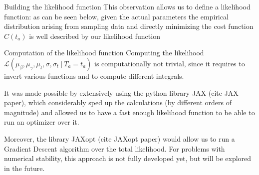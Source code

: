 \documentclass{beamer}
\begin{document}
\begin{frame}{Building the likelihood function}
  This observation allows us to define a likelihood function:
  as can be seen below, given the actual parameters the empirical distribution arising from sampling data and directly minimizing the cost function \(C(t_a)\) is well described by our likelihood function

  \begin{center}
  \end{center}
\end{frame}

\begin{frame}{Computation of the likelihood function}
  Computing the likelihood \(\mathcal{L}(\mu_\beta, \mu_\gamma, \mu_t, \sigma, \sigma_t\ \vert\ T_a = t_a)\) is computationally not trivial, since it requires to invert various functions and to compute different integrals.

  It was made possible by extensively using the python library JAX (cite JAX paper), which considerably sped up the calculations (by different orders of magnitude) and allowed us to have a fast enough likelihood function to be able to run an optimizer over it.

  Moreover, the library JAXopt (cite JAXopt paper)  would allow us to run a Gradient Descent algorithm over the total likelihood.
  For problems with numerical stability, this approach is not fully developed yet, but will be explored in the future.
\end{frame}
\end{document}
